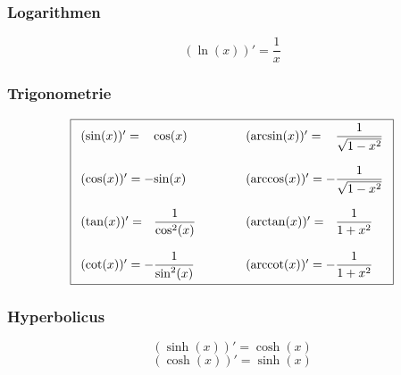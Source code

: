 \subsubsection{Logarithmen}
\[ \boxed{ (\ln(x))' = \frac{1}{x} } \]  

\subsubsection{Trigonometrie}

\[ \boxed{ \begin{array}{ l @{}l @{\quad\quad\quad}l @{}l }
(\sin(x))' =   &\cos(x)             & \quad (\arcsin(x))' =   & \dfrac{1}{\sqrt{1 - x^2}} \\\\
(\cos(x))' = - &\sin(x)             & \quad (\arccos(x))' = - & \dfrac{1}{\sqrt{1 - x^2}} \\\\
(\tan(x))' =   &\dfrac{1}{\cos^2(x)} & \quad (\arctan(x))' =   & \dfrac{1}{1 + x^2} \\\\
(\cot(x))' = - &\dfrac{1}{\sin^2(x)} & \quad (\arccot(x))' = - & \dfrac{1}{1 + x^2} 
\end{array}} \]

\subsubsection{Hyperbolicus}
\[ \boxed{(\sinh(x))' = \cosh(x)} \]
\[ \boxed{(\cosh(x))' = \sinh(x)} \]
